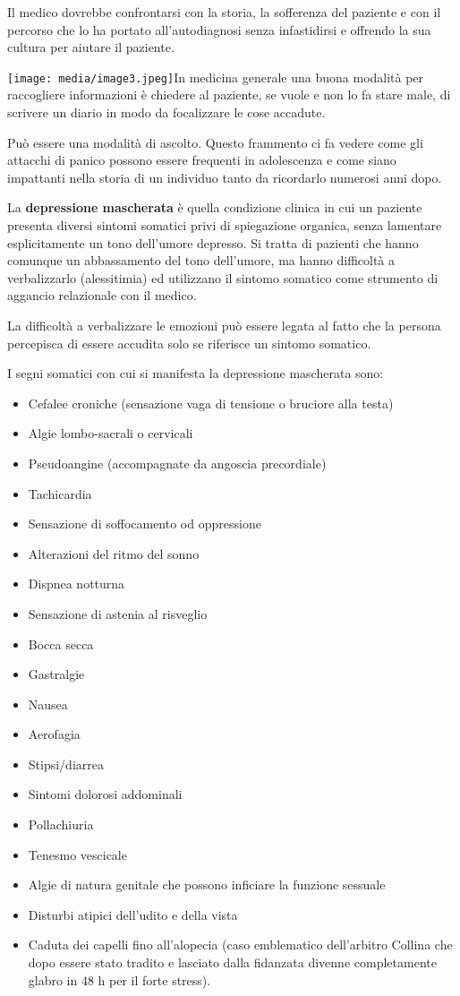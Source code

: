 \documentclass[]{article}
\begin{document}
Il medico dovrebbe confrontarsi con la storia, la sofferenza del
paziente e con il percorso che lo ha portato all'autodiagnosi senza
infastidirsi e offrendo la sua cultura per aiutare il paziente.

\texttt{[image: media/image3.jpeg]}In
medicina generale una buona modalità per raccogliere informazioni è
chiedere al paziente, se vuole e non lo fa stare male, di scrivere un
diario in modo da focalizzare le cose accadute.

Può essere una modalità di ascolto. Questo frammento ci fa vedere come
gli attacchi di panico possono essere frequenti in adolescenza e come
siano impattanti nella storia di un individuo tanto da ricordarlo
numerosi anni dopo.

La \textbf{depressione mascherata} è quella condizione clinica in cui un
paziente presenta diversi sintomi somatici privi di spiegazione
organica, senza lamentare esplicitamente un tono dell'umore depresso. Si
tratta di pazienti che hanno comunque un abbassamento del tono
dell'umore, ma hanno difficoltà a verbalizzarlo (alessitimia) ed
utilizzano il sintomo somatico come strumento di aggancio relazionale
con il medico.

La difficoltà a verbalizzare le emozioni può essere legata al fatto che
la persona percepisca di essere accudita solo se riferisce un sintomo
somatico.

I segni somatici con cui si manifesta la depressione mascherata sono:

\begin{itemize}
\item
  Cefalee croniche (sensazione vaga di tensione o bruciore alla testa)
\item
  Algie lombo-sacrali o cervicali
\item
  Pseudoangine (accompagnate da angoscia precordiale)
\item
  Tachicardia
\item
  Sensazione di soffocamento od oppressione
\item
  Alterazioni del ritmo del sonno
\item
  Dispnea notturna
\item
  Sensazione di astenia al risveglio
\item
  Bocca secca
\item
  Gastralgie
\item
  Nausea
\item
  Aerofagia
\item
  Stipsi/diarrea
\item
  Sintomi dolorosi addominali
\item
  Pollachiuria
\item
  Tenesmo vescicale
\item
  Algie di natura genitale che possono inficiare la funzione sessuale
\item
  Disturbi atipici dell'udito e della vista
\item
  Caduta dei capelli fino all'alopecia (caso emblematico dell'arbitro
  Collina che dopo essere stato tradito e lasciato dalla fidanzata
  divenne completamente glabro in 48 h per il forte stress).
\end{itemize}
\end{document}
